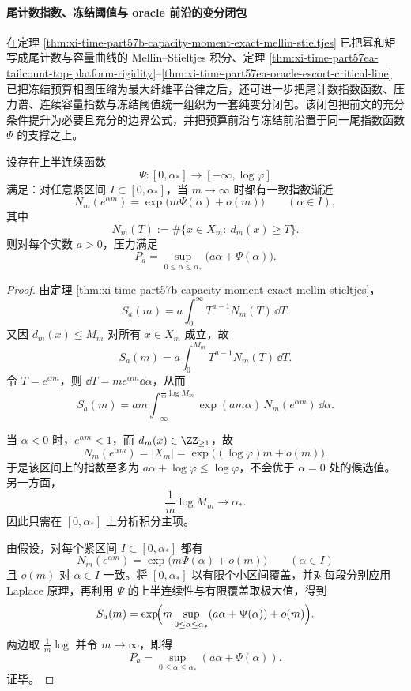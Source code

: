 \paragraph{尾计数指数、冻结阈值与 oracle 前沿的变分闭包}
在定理 \ref{thm:xi-time-part57b-capacity-moment-exact-mellin-stieltjes} 已把幂和矩写成尾计数与容量曲线的 Mellin--Stieltjes 积分、定理 \ref{thm:xi-time-part57ea-tailcount-top-platform-rigidity}--\ref{thm:xi-time-part57ea-oracle-escort-critical-line} 已把冻结预算相图压缩为最大纤维平台律之后，还可进一步把尾计数指数函数、压力谱、连续容量指数与冻结阈值统一组织为一套纯变分闭包。该闭包把前文的充分条件提升为必要且充分的边界公式，并把预算前沿与冻结前沿置于同一尾指数函数 \(\Psi\) 的支撑之上。

\begin{theorem}\label{thm:xi-time-part57eb-tail-laplace-mellin-variational}
设存在上半连续函数
\[
\Psi:[0,\alpha_*]\to[-\infty,\log\varphi]
\]
满足：对任意紧区间 \(I\subset[0,\alpha_*]\)，当 \(m\to\infty\) 时都有一致指数渐近
\[
N_m(e^{\alpha m})
=
\exp\!\bigl(m\Psi(\alpha)+o(m)\bigr)
\qquad
(\alpha\in I),
\]
其中
\[
N_m(T):=\#\{x\in X_m:\ d_m(x)\ge T\}.
\]
则对每个实数 \(a>0\)，压力满足
\[
\boxed{\;
P_a=\sup_{0\le \alpha\le \alpha_*}\bigl(a\alpha+\Psi(\alpha)\bigr).\;}
\]
\end{theorem}
\begin{proof}
由定理 \ref{thm:xi-time-part57b-capacity-moment-exact-mellin-stieltjes}，
\[
S_a(m)=a\int_0^\infty T^{a-1}N_m(T)\,\dd T.
\]
又因 \(d_m(x)\le M_m\) 对所有 \(x\in X_m\) 成立，故
\[
S_a(m)=a\int_0^{M_m}T^{a-1}N_m(T)\,\dd T.
\]
令 \(T=e^{\alpha m}\)，则 \(\dd T=me^{\alpha m}\dd\alpha\)，从而
\[
S_a(m)
=
am\int_{-\infty}^{\frac1m\log M_m}
\exp(am\alpha)\,N_m(e^{\alpha m})\,\dd\alpha.
\]

当 \(\alpha<0\) 时，\(e^{\alpha m}<1\)，而 \(d_m(x)\in\ZZ_{\ge 1}\)，故
\[
N_m(e^{\alpha m})=|X_m|
=
\exp\!\bigl((\log\varphi)m+o(m)\bigr).
\]
于是该区间上的指数至多为 \(a\alpha+\log\varphi\le \log\varphi\)，不会优于 \(\alpha=0\) 处的候选值。另一方面，
\[
\frac1m\log M_m\to \alpha_*.
\]
因此只需在 \([0,\alpha_*]\) 上分析积分主项。

由假设，对每个紧区间 \(I\subset[0,\alpha_*]\) 都有
\[
N_m(e^{\alpha m})=\exp\!\bigl(m\Psi(\alpha)+o(m)\bigr)
\qquad(\alpha\in I)
\]
且 \(o(m)\) 对 \(\alpha\in I\) 一致。将 \([0,\alpha_*]\) 以有限个小区间覆盖，并对每段分别应用 Laplace 原理，再利用 \(\Psi\) 的上半连续性与有限覆盖取极大值，得到
\[
S_a(m)
=
\exp\!\Bigl(
m\sup_{0\le \alpha\le \alpha_*}(a\alpha+\Psi(\alpha))+o(m)
\Bigr).
\]
两边取 \(\frac1m\log\) 并令 \(m\to\infty\)，即得
\[
P_a=\sup_{0\le \alpha\le \alpha_*}(a\alpha+\Psi(\alpha)).
\]
证毕。
\end{proof}

